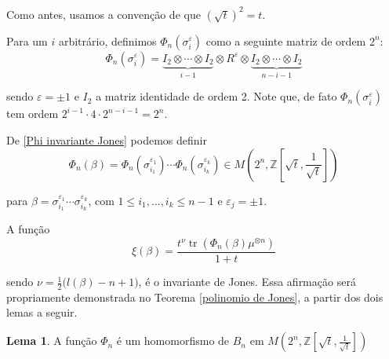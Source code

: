 \documentclass[a4paper,portuguese,11pt,twoside, leqno]{book}
\DeclareMathOperator{\tr}{tr}
\theoremstyle{definition}
\newtheorem{lemma}[theorem]{Lema}
\begin{document}
	\par\vspace{0.3cm} Como antes, usamos a convenção de que $(\sqrt{t})^2 = t$.
	\par\vspace{0.3cm} Para um $i$ arbitrário, definimos $\Phi_n(\sigma_i^{\varepsilon})$ como a seguinte matriz de ordem $2^n$:
	\begin{equation}
	\label{Phi invariante Jones}
	\Phi_n(\sigma_i^{\varepsilon}) = \underbrace{I_2\otimes\cdots\otimes I_2}_{i-1}\otimes R^{\varepsilon}\otimes\underbrace{I_2\otimes\cdots\otimes I_2}_{n-i-1}
	\end{equation}
	\par\vspace{0.3cm} sendo $\varepsilon=\pm1$ e $I_2$ a matriz identidade de ordem 2. Note que, de fato $\Phi_n(\sigma_i^{\varepsilon})$ tem ordem $2^{i-1}\cdot4\cdot2^{n-i-1} = 2^n$.
	\par\vspace{0.3cm} De \eqref{Phi invariante Jones} podemos definir
	\begin{equation}
	\label{parte 2 invariante Jones}
	\Phi_n(\beta) = \Phi_n(\sigma_{i_1}^{\varepsilon_1})\cdots\Phi_n(\sigma_{i_k}^{\varepsilon_k})\in M(2^n, \mathbb{Z}[\sqrt{t}, \frac{1}{\sqrt{t}}])
	\end{equation}
	\par\vspace{0.3cm} para $\beta = \sigma_{i_1}^{\varepsilon_1}\cdots\sigma_{i_k}^{\varepsilon_k}$, com $1\leq i_1, \dots, i_k\leq n-1$ e $\varepsilon_j=\pm1$. 
	\par\vspace{0.3cm} A função
	\begin{equation*}
	\xi(\beta) = \frac{t^{\nu}\tr(\Phi_n(\beta)\mu^{\otimes n})}{1+t}
	\end{equation*}
	\par\vspace{0.3cm} sendo $\nu = \displaystyle{ \frac{1}{2}\big(l(\beta) - n + 1\big) }$, é o invariante de Jones. Essa afirmação será propriamente demonstrada no Teorema \eqref{polinomio de Jones}, a partir dos dois lemas a seguir.
	\begin{lemma}
		\label{lema 1 Jones}
		A função $\Phi_n$ é um homomorfismo de $B_n$ em $M(2^n, \mathbb{Z}[\sqrt{t}, \frac{1}{\sqrt{t}}])$
	\end{lemma}
\end{document}
